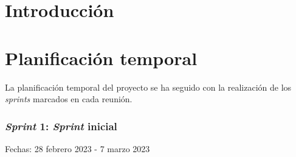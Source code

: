 
\section{Introducción}

\section{Planificación temporal}
La planificación temporal del proyecto se ha seguido con la realización de los \textit{sprints} marcados en cada reunión.

\subsubsection{\textit{Sprint} 1: \textit{Sprint} inicial}
Fechas: 28 febrero 2023 - 7 marzo 2023
